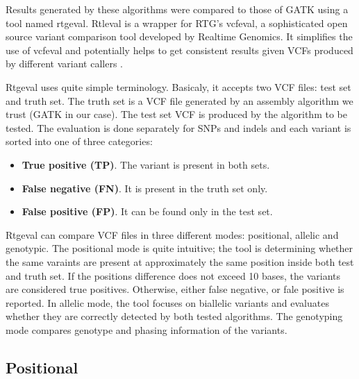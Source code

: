 Results generated by these algorithms were compared to those of GATK using a tool named rtgeval. Rtleval is a wrapper for RTG's vcfeval, a sophisticated open source variant comparison tool developed by Realtime Genomics. It simplifies the use of vcfeval and potentially helps to get consistent results given VCFs produced by different variant callers \cite{rtgeval}.

Rtgeval uses quite simple terminology. Basicaly, it accepts two VCF files: test set and truth set. The truth set is a VCF file generated by an assembly algorithm we trust (GATK in our case). The test set VCF is produced by the algorithm to be tested. The evaluation is done separately for SNPs and indels and each variant is sorted into one of three categories:
\begin{itemize}
\item \textbf{True positive (TP)}. The variant is present in both sets.
\item \textbf{False negative (FN)}. It is present in the truth set only.
\item \textbf{False positive (FP)}. It can be found only in the test set.
\end{itemize}

Rtgeval can compare VCF files in three different modes: positional, allelic and genotypic. The positional mode is quite intuitive; the tool is determining whether the same varaints are present at approximately the same position inside both test and truth set. If the positions difference does not exceed 10 bases, the variants are considered true positives. Otherwise, either false negative, or fale positive is reported. In allelic mode, the tool focuses on biallelic variants and evaluates whether they are correctly detected by both tested algorithms. The genotyping mode compares genotype and phasing information of the variants.

\subsection{Positional}
\label{subsec:positional-results}

